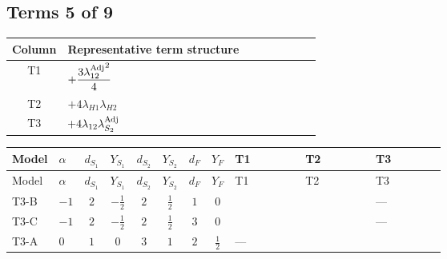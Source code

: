 \documentclass[8pt]{article}
\begin{document}
\begin{landscape}
\subsection*{Terms 5 of 9}
\begin{center}
\begin{tabular}{@{}c >{\raggedright\arraybackslash}p{0.82\linewidth}@{}}
\toprule
Column & Representative term structure \\
\midrule
T1 & \(\displaystyle +\frac{3 {\lambda_{12}^{\rm Adj}}^2}{4}\) \\
\midrule
T2 & \(\displaystyle +4 {\lambda_{H1}} {\lambda_{H2}}\) \\
\midrule
T3 & \(\displaystyle +4 {\lambda_{12}} {\lambda_{S_2}^{\rm Adj}}\) \\
\midrule
\bottomrule
\end{tabular}
\end{center}
\smallskip
\tiny
\begin{longtable}{@{}llcccccc >{\raggedright\arraybackslash}p{0.21\linewidth} >{\raggedright\arraybackslash}p{0.21\linewidth} >{\raggedright\arraybackslash}p{0.21\linewidth}@{}}
\toprule
Model & $\alpha$ & $d_{S_1}$ & $Y_{S_1}$ & $d_{S_2}$ & $Y_{S_2}$ & $d_F$ & $Y_F$ & T1 & T2 & T3 \\
\midrule
\endfirsthead
\toprule
Model & $\alpha$ & $d_{S_1}$ & $Y_{S_1}$ & $d_{S_2}$ & $Y_{S_2}$ & $d_F$ & $Y_F$ & T1 & T2 & T3 \\
\midrule
\endhead
T3-B & $-1$ & $2$ & $-\frac{1}{2}$ & $2$ & $\frac{1}{2}$ & $1$ & $0$ & \scriptsize\adjustbox{max width=\linewidth}{$\begin{gathered} +\frac{3 {\lambda_{12}^{\rm Adj}}^2}{4}\end{gathered}$} & \scriptsize\adjustbox{max width=\linewidth}{$\begin{gathered} +4 {\lambda_{H1}} {\lambda_{H2}}\end{gathered}$} & --- \\
\midrule
T3-C & $-1$ & $2$ & $-\frac{1}{2}$ & $2$ & $\frac{1}{2}$ & $3$ & $0$ & \scriptsize\adjustbox{max width=\linewidth}{$\begin{gathered} +\frac{3 {\lambda_{12}^{\rm Adj}}^2}{4}\end{gathered}$} & \scriptsize\adjustbox{max width=\linewidth}{$\begin{gathered} +4 {\lambda_{H1}} {\lambda_{H2}}\end{gathered}$} & --- \\
\midrule
T3-A & $0$ & $1$ & $0$ & $3$ & $1$ & $2$ & $\frac{1}{2}$ & --- & \scriptsize\adjustbox{max width=\linewidth}{$\begin{gathered} +4 {\lambda_{H1}} {\lambda_{H2}}\end{gathered}$} & \scriptsize\adjustbox{max width=\linewidth}{$\begin{gathered} +4 {\lambda_{12}} {\lambda_{S_2}^{\rm Adj}}\end{gathered}$} \\

\end{longtable}
\end{landscape}
\end{document}

